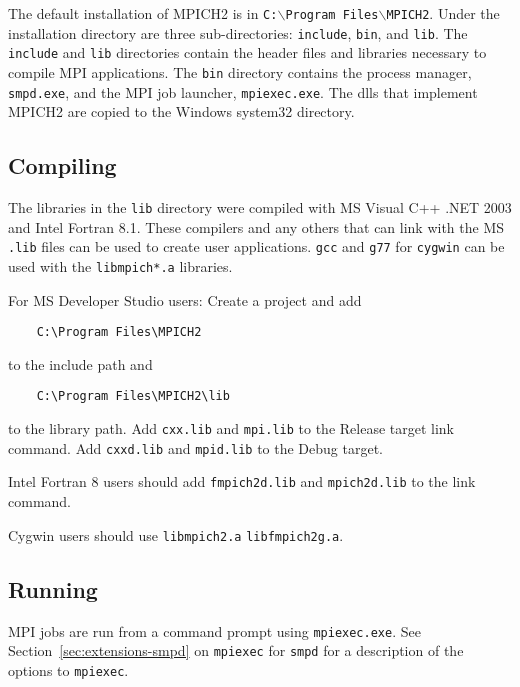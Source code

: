 \documentclass[dvipdfm,11pt]{article}
\begin{document}
The default installation of MPICH2 is in
\texttt{C:$\backslash$Program Files$\backslash$MPICH2}. Under the installation
directory are three sub-directories: \texttt{include}, \texttt{bin}, and
\texttt{lib}.  The \texttt{include} and \texttt{lib} directories contain
the header files and libraries necessary to compile MPI applications.  
The \texttt{bin} directory contains the process manager, \texttt{smpd.exe},
and the MPI job launcher, \texttt{mpiexec.exe}.  The dlls that implement
MPICH2 are copied to the Windows system32 directory.

\subsection{Compiling}
\label{sec:wincompile}

The libraries in the \texttt{lib} directory were compiled with MS Visual C++ .NET 2003
and Intel Fortran 8.1.  These 
compilers and any others that can link with the MS \texttt{.lib} files can be used to
create user applications.  \texttt{gcc} and \texttt{g77} for \texttt{cygwin} can be used with the 
\texttt{libmpich*.a} libraries.

For MS Developer Studio users: Create a project and add
\begin{verbatim}
    C:\Program Files\MPICH2
\end{verbatim}
to the include path and
\begin{verbatim}
    C:\Program Files\MPICH2\lib
\end{verbatim}
to
the library path.  Add \texttt{cxx.lib} and \texttt{mpi.lib} to the
Release target link command.  Add \texttt{cxxd.lib} and
\texttt{mpid.lib} to the Debug target.

Intel Fortran 8 users should add \texttt{fmpich2d.lib} and
\texttt{mpich2d.lib} to the link command. 

Cygwin users should use \texttt{libmpich2.a} \texttt{libfmpich2g.a}.

\subsection{Running}
\label{sec:winrun}

MPI jobs are run from a command prompt using \texttt{mpiexec.exe}.  See
Section~\ref{sec:extensions-smpd} on \texttt{mpiexec} for \texttt{smpd}
for a description of the options to \texttt{mpiexec}.




\end{document}
